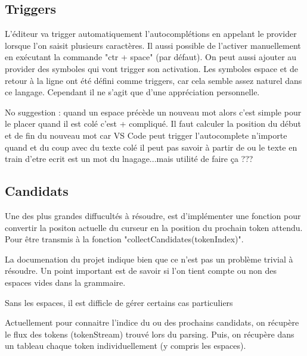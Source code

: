 \documentclass[
    iict, %
    il, %
]{heig-tb}
\begin{document}
\subsection{Triggers}
L'éditeur va trigger automatiquement l'autocomplétions en appelant le provider lorsque l'on saisit plusieurs caractères. Il aussi possible de l'activer manuellement en exécutant la commande "ctr + space" (par défaut).
On peut aussi ajouter au provider des symboles qui vont trigger son activation. Les symboles espace et de retour à la ligne ont été défini comme triggers, car cela semble assez naturel dans ce langage. Cependant il ne s'agit que d'une appréciation personnelle.

No suggestion :
quand un espace précède un nouveau mot alors c'est simple pour le placer
quand il est colé c'est + compliqué. Il faut calculer la position du début et de fin du nouveau mot car VS Code peut trigger l'autocomplete n'importe quand et du coup
avec du texte colé il peut pas savoir à partir de ou le texte en train d'etre ecrit est un mot du lnagage...mais utilité de faire ça ???


\subsection{Candidats}\label{candidates}

Une des plus grandes diffucultés à résoudre, est d'implémenter une fonction pour convertir la positon actuelle du curseur en la position du prochain token attendu.
Pour être transmis à la fonction "collectCandidates(tokenIndex)". %

La documenation du projet indique bien que ce n'est pas un problème trivial à résoudre.
Un point important est de savoir si l'on tient compte ou non des espaces vides dans la grammaire.

Sans les espaces, il est difficle de gérer certains cas particuliers %



Actuellement pour connaitre l'indice du ou des prochains candidats, on récupère le flux des tokens (tokenStream) trouvé lors du parsing.
Puis, on récupère dans un tableau chaque token individuellement (y compris les espaces).
\end{document}
